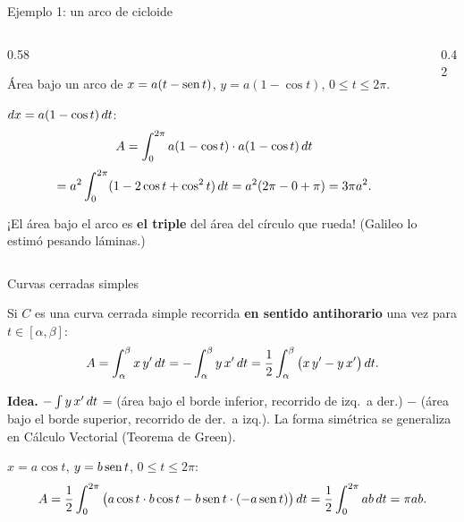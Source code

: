 \documentclass[10pt,aspectratio=169]{beamer}
\begin{document}
\begin{frame}{Ejemplo 1: un arco de cicloide}
  \begin{columns}
    \begin{column}{0.58\textwidth}
      \begin{ejemplo}
        Área bajo un arco de $x=a(t-\operatorname{sen} t)$, $y=a(1-\cos t)$, $0\le t\le2\pi$.

        $dx=a(1-\cos t)\,dt$:
        \[ A=\int_0^{2\pi}a(1-\cos t)\cdot a(1-\cos t)\,dt \]
        \[ =a^2\int_0^{2\pi}(1-2\cos t+\cos^2t)\,dt=a^2(2\pi-0+\pi)=3\pi a^2. \]
      \end{ejemplo}
      \begin{idea}
        ¡El área bajo el arco es \textbf{el triple} del área del círculo que rueda! (Galileo lo estimó pesando láminas.)
      \end{idea}
    \end{column}
    \begin{column}{0.42\textwidth}
      \centering
    \end{column}
  \end{columns}
\end{frame}

\begin{frame}{Curvas cerradas simples}
  \begin{teorema}
    Si $C$ es una curva cerrada simple recorrida \textbf{en sentido antihorario} una vez para $t\in[\alpha,\beta]$:
    \[ A=\int_\alpha^\beta x\,y'\,dt=-\int_\alpha^\beta y\,x'\,dt=\frac12\int_\alpha^\beta\big(x\,y'-y\,x'\big)\,dt. \]
  \end{teorema}
  \textbf{Idea.} $-\int y\,x'\,dt$ = (área bajo el borde inferior, recorrido de izq.\ a der.) $-$ (área bajo el borde
  superior, recorrido de der.\ a izq.). La forma simétrica se generaliza en Cálculo Vectorial (Teorema de Green).
  \begin{ejemplo}[2: elipse]
    $x=a\cos t$, $y=b\operatorname{sen} t$, $0\le t\le2\pi$:
    \[ A=\frac12\int_0^{2\pi}\big(a\cos t\cdot b\cos t-b\operatorname{sen} t\cdot(-a\operatorname{sen} t)\big)\,dt=\frac12\int_0^{2\pi}ab\,dt=\pi ab. \]
  \end{ejemplo}
\end{frame}
\end{document}
